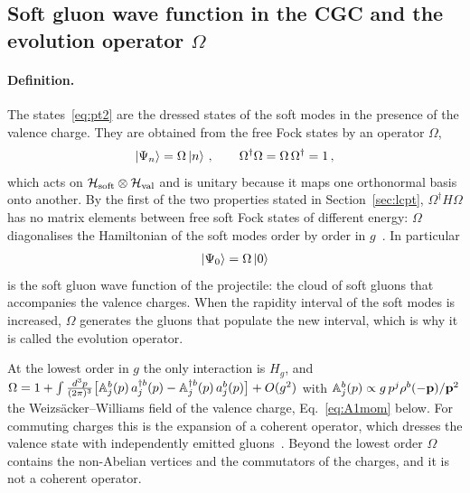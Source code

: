 \subsection{Soft gluon wave function in the CGC and the evolution operator \texorpdfstring{$\Omega$}{Omega}}\label{sec:omega_def}

\paragraph{Definition.} The states~\eqref{eq:pt2} are the dressed states of the soft modes in the presence of the valence charge. They are obtained from the free Fock states by an operator $\Omega$,
\begin{align}\label{eq:Omegadef}
\ket{\Psi_n}=\Omega\ket n\,,\qquad \Omega^\dagger\Omega=\Omega\,\Omega^\dagger=1\,,
\end{align}
which acts on $\mathcal H_{\rm soft}\otimes\mathcal H_{\rm val}$ and is unitary because it maps one orthonormal basis onto another. By the first of the two properties stated in Section~\ref{sec:lcpt}, $\Omega^\dagger H\Omega$ has no matrix elements between free soft Fock states of different energy: $\Omega$ diagonalises the Hamiltonian of the soft modes order by order in $g$~\cite{Kovner:2005en,Radhakrishnan:2026soft}. In particular
\begin{align}
\ket{\Psi_0}=\Omega\ket0
\end{align}
is the soft gluon wave function of the projectile: the cloud of soft gluons that accompanies the valence charges. When the rapidity interval of the soft modes is increased, $\Omega$ generates the gluons that populate the new interval, which is why it is called the evolution operator.

At the lowest order in $g$ the only interaction is $H_g$, and $\Omega=1+\int\frac{d^3p}{(2\pi)^3}\big[\mathbb{A}^b_j(p)\,a^{\dagger b}_j(p)-\mathbb{A}^{\dagger b}_j(p)\,a^b_j(p)\big]+O(g^2)$ with $\mathbb{A}^b_j(p)\propto g\,p^j\rho^b(-\mathbf{p})/\mathbf{p}^2$ the Weizs\"acker--Williams field of the valence charge, Eq.~\eqref{eq:A1mom} below. For commuting charges this is the expansion of a coherent operator, which dresses the valence state with independently emitted gluons~\cite{Kovner:2005en}. Beyond the lowest order $\Omega$ contains the non-Abelian vertices and the commutators of the charges, and it is not a coherent operator.

